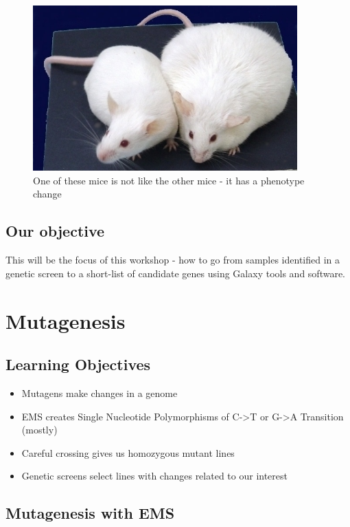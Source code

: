 \documentclass[12pt,]{book}
\providecommand{\tightlist}{%
  \setlength{\itemsep}{0pt}\setlength{\parskip}{0pt}}
\theoremstyle{definition}
\theoremstyle{definition}
\theoremstyle{remark}
\begin{document}
\begin{figure}
\includegraphics[width=4.01in]{assets/obese-mouse} \caption{One of these mice is not like the other mice - it has a phenotype change}\label{fig:mice}
\end{figure}

\section*{Our objective}\label{our-objective}

This will be the focus of this workshop - how to go from samples
identified in a genetic screen to a short-list of candidate genes using
Galaxy tools and software.

\chapter{Mutagenesis}\label{mutagenesis}

\section{Learning Objectives}\label{learning-objectives}

\begin{itemize}
\tightlist
\item
  Mutagens make changes in a genome
\item
  EMS creates Single Nucleotide Polymorphisms of C-\textgreater{}T or
  G-\textgreater{}A Transition (mostly)
\item
  Careful crossing gives us homozygous mutant lines
\item
  Genetic screens select lines with changes related to our interest
\end{itemize}

\section{Mutagenesis with EMS}\label{mutagenesis-with-ems}
\end{document}
